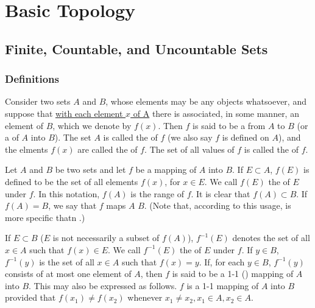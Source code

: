 \chapter{Basic Topology}

\section{Finite, Countable, and Uncountable Sets}

\subsection{Definitions}
\begin{deff}
	Consider two sets $A$ and $B$, whose elements may be any objects whatsoever, and suppose that {\underline{with each element $x$ of A}} there is associated, in some manner, an element of $B$, which we denote by $f(x)$. Then $f$ is said to be a {} from $A$ to $B$ (or a {} of $A$ into $B$). The set $A$ is called the {} of $f$ (we also say $f$ is defined on $A$), and the elments $f(x)$ are called the {} of $f$. The set of all values of $f$ is called the {} of $f$.
\end{deff}

\begin{deff}\label{def: mapping}
	Let $A$ and $B$ be two sets and let $f$ be a mapping of $A$ into $B$. If $E \subset A$, $f(E)$ is defined to be the set of all elements $f(x)$, for $x \in E$. We call $f(E)$ the {} of $E$ under $f$. In this notation, $f(A)$ is the range of $f$. It is clear that $f(A) \subset B$. If $f(A) = B$, we say that $f$ maps $A$ {} $B$. (Note that, according to this usage, {} is more specific thatn {}.)
\end{deff}

\begin{deff}
	If $E \subset B$ ($E$ is not necessarily a subset of $f(A)$), $f^{-1}(E)$ denotes the set of all $x \in A$ such that $f(x) \in E$. We call $f^{-1}(E)$ the {} of $E$ under $f$. If $y \in B$, $f^{-1}(y)$ is the set of all $x \in A$ such that $f(x) = y$. If, for each $y \in B$, $f^{-1}(y)$ consists of at most one element of $A$, then $f$ is said to be a 1-1 ({}) mapping of $A$ into $B$. This may also be expressed as follows. $f$ is a 1-1 mapping of $A$ into $B$ provided that $f(x_1) \ne f(x_2)$ whenever $x_1 \ne x_2, x_1 \in A, x_2 \in A$.
\end{deff}

